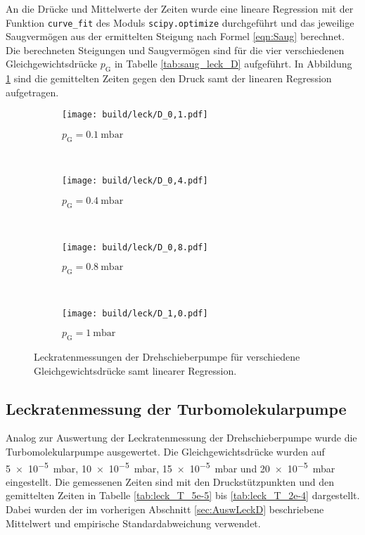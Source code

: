 



\FloatBarrier

An die Drücke und Mittelwerte der Zeiten wurde eine
lineare Regression mit der Funktion \texttt{curve\_fit}
des Moduls \texttt{scipy.optimize} durchgeführt
und das jeweilige Saugvermögen aus der ermittelten Steigung nach Formel \eqref{eqn:Saug}
berechnet. Die berechneten Steigungen und Saugvermögen sind für
die vier verschiedenen Gleichgewichtsdrücke $p_\text{G}$
in Tabelle \ref{tab:saug_leck_D} aufgeführt.
In Abbildung \ref{fig:leck_D} sind die gemittelten Zeiten gegen den Druck
samt der linearen Regression aufgetragen.

\begin{figure}
  \centering
  \begin{subfigure}[b]{0.48\textwidth}
    \texttt{[image: build/leck/D\_0,1.pdf]}
    \caption{$p_\text{G} = \SI{0.1}{\milli\bar}$}
  \end{subfigure}
  ~ %
  \begin{subfigure}[b]{0.48\textwidth}
    \texttt{[image: build/leck/D\_0,4.pdf]}
    \caption{$p_\text{G} = \SI{0.4}{\milli\bar}$}
  \end{subfigure}
  \\
  \begin{subfigure}[b]{0.48\textwidth}
    \texttt{[image: build/leck/D\_0,8.pdf]}
    \caption{$p_\text{G} = \SI{0.8}{\milli\bar}$}
  \end{subfigure}
  ~ %
  \begin{subfigure}[b]{0.48\textwidth}
    \texttt{[image: build/leck/D\_1,0.pdf]}
    \caption{$p_\text{G} = \SI{1}{\milli\bar}$}
  \end{subfigure}
  \caption{Leckratenmessungen der Drehschieberpumpe für verschiedene Gleichgewichtsdrücke samt linearer Regression.}
  \label{fig:leck_D}
\end{figure}


\FloatBarrier

\subsection{Leckratenmessung der Turbomolekularpumpe}
\label{sec:AuswLeckT}

Analog zur Auswertung der Leckratenmessung der Drehschieberpumpe wurde die
Turbomolekularpumpe ausgewertet.
Die Gleichgewichtsdrücke wurden auf
\SI{5e-5}{\milli\bar}, \SI{10e-5}{\milli\bar}, \SI{15e-5}{\milli\bar} und \SI{20e-5}{\milli\bar}
eingestellt. Die gemessenen Zeiten sind mit den Druckstützpunkten und den
gemittelten Zeiten in Tabelle \ref{tab:leck_T_5e-5} bis \ref{tab:leck_T_2e-4}
dargestellt. Dabei wurden der im vorherigen Abschnitt \ref{sec:AuswLeckD}
beschriebene Mittelwert und empirische Standardabweichung verwendet.

